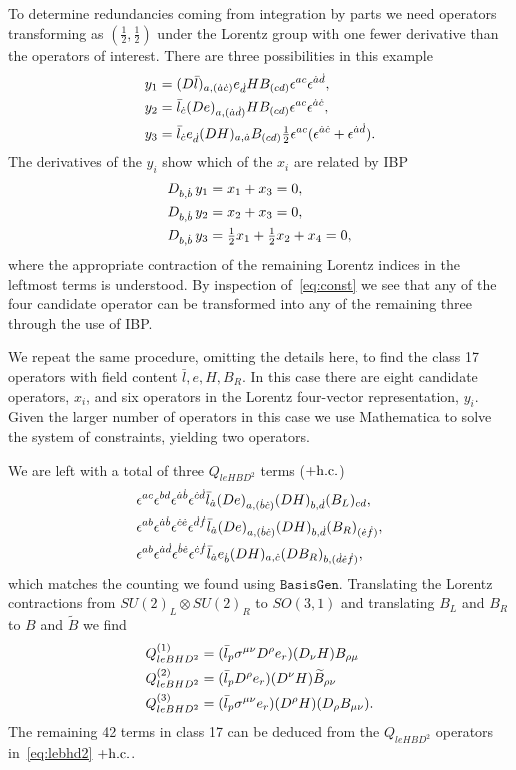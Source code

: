\begin{enumerate}
To determine redundancies coming from integration by parts we need operators transforming as $(\tfrac{1}{2}, \tfrac{1}{2})$ under the Lorentz group with one fewer derivative than the operators of interest.
There are three possibilities in this example
\begin{align}
\label{eq:ibp}
y_1 &= (D \bar l)_{a, (\dot a \dot c)} e_{\dot d} H B_{(c d)} \epsilon^{a c} \epsilon^{\dot a \dot d}, \nonumber\\ 
y_2 &= \bar l_{\dot c} (D e)_{a, (\dot a \dot d)} H B_{(c d)} \epsilon^{a c} \epsilon^{\dot a \dot c}, \nonumber\\ 
y_3 &= \bar l_{\dot c} e_{\dot d} (D H)_{a, \dot a} B_{(c d)} \tfrac{1}{2} \epsilon^{a c} (\epsilon^{\dot a \dot c} + \epsilon^{\dot a \dot d}) . 
\end{align}
The derivatives of the $y_i$ show which of the $x_i$ are related by IBP
\begin{align}
\label{eq:const}
D_{b, \dot b}\, y_1 &= x_1 + x_3 = 0 ,\nonumber\\ 
D_{b, \dot b}\, y_2 &= x_2 + x_3 = 0 ,\nonumber\\ 
D_{b, \dot b}\, y_3 &= \tfrac{1}{2} x_1 + \tfrac{1}{2} x_2 + x_4 = 0 ,
\end{align}
where the appropriate contraction of the remaining Lorentz indices in the leftmost terms is understood.
By inspection of~\eqref{eq:const} we see that any of the four candidate operator can be transformed into any of the remaining three through the use of IBP.

We repeat the same procedure, omitting the details here, to find the class 17 operators with field content $\bar l, e, H, B_R$.
In this case there are eight candidate operators, $x_i$, and six operators in the Lorentz four-vector representation, $y_i$.
Given the larger number of operators in this case we use Mathematica to solve the system of constraints, yielding two operators.

We are left with a total of three $Q_{leHBD^2}$ terms ($+ \mathrm{h.c.}$)
\begin{align}
&\epsilon^{a c} \epsilon^{b d} \epsilon^{\dot a \dot b} \epsilon^{\dot c \dot d} \bar l_{\dot a} (D e)_{a, (\dot b \dot c)} (D H)_{b, \dot d} (B_L)_{c d} , \nonumber\\ 
&\epsilon^{ab} \epsilon^{\dot a \dot b} \epsilon^{\dot c \dot e} \epsilon^{\dot d \dot f} \bar l_{\dot a} (D e)_{a, (\dot b \dot c)} (D H)_{b, \dot d} (B_R)_{(\dot e \dot f)} , \nonumber\\ 
&\epsilon^{ab} \epsilon^{\dot a \dot d} \epsilon^{\dot b \dot e} \epsilon^{\dot c \dot f} \bar l_{\dot a} e_{\dot b} (D H)_{a, \dot c} (D B_R)_{b, (\dot d \dot e \dot f)} ,
\end{align}
which matches the counting we found using $\mathtt{BasisGen}$.
Translating the Lorentz contractions from $SU(2)_L \otimes SU(2)_R$ to $SO(3, 1)$ and translating $B_L$ and $B_R$ to $B$ and $\widetilde B$ we find
\begin{align}
\label{eq:lebhd2}
Q_{leBHD^2}^{(1)} &= (\bar l_p \sigma^{\mu\nu} D^\rho e_r) (D_\nu H) B_{\rho\mu} \nonumber\\ 
Q_{leBHD^2}^{(2)} &= (\bar l_p D^\rho e_r) (D^\nu H) \widetilde B_{\rho\nu} \nonumber\\ 
Q_{leBHD^2}^{(3)} &= (\bar l_p \sigma^{\mu\nu} e_r) (D^\rho H) (D_\rho B_{\mu\nu}) .
\end{align}
The remaining 42 terms in class 17 can be deduced from the $Q_{leHBD^2}$ operators in~\eqref{eq:lebhd2} $+ \mathrm{h.c.}$.


\end{enumerate}
